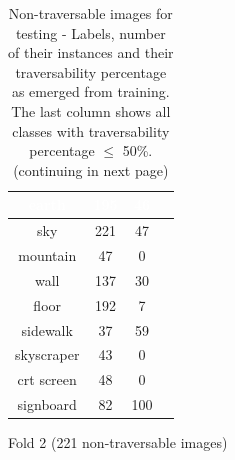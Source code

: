 \documentclass[12pt,a4paper,table,dvipsnames,tikz]{report}
\newcommand{\white}[1]{\textbf{\textcolor{white}{#1}}} %
\begin{document}
\begin{table}[h!]
\begin{subtable}[h!]{\textwidth}
\begin{tabular}{|c|c|c|c|}
				\hline
				\rowcolor{earth}
				\white{earth} & \white{195} & \white{46} & \white{\checkmark}\\
				\hline
				\rowcolor{sky}
				sky & 221 & 47 & \checkmark\\
				\hline
				mountain & 47 & 0 & \checkmark\\
				\hline
				wall & 137 & 30 & \checkmark\\
				\hline
				floor & 192 & 7 & \checkmark\\
				\hline
				sidewalk & 37 & 59 &\\
				\hline
				skyscraper & 43 & 0 & \checkmark\\
				\hline
				crt screen & 48 & 0 & \checkmark\\
				\hline
				signboard & 82 & 100 &\\
				\hline
			\end{tabular}
			\caption{Fold 2 (221 non-traversable images)}
			\label{table:obst.f2}
		\end{subtable}
		\caption{Non-traversable images for testing - Labels, number of their instances and their 
			traversability percentage as emerged from training. The last column shows all classes 
			with traversability percentage $\le$ 50\%. (continuing in next page)}
		\label{table:obst.folds}
	\end{table}
	
\end{document}
